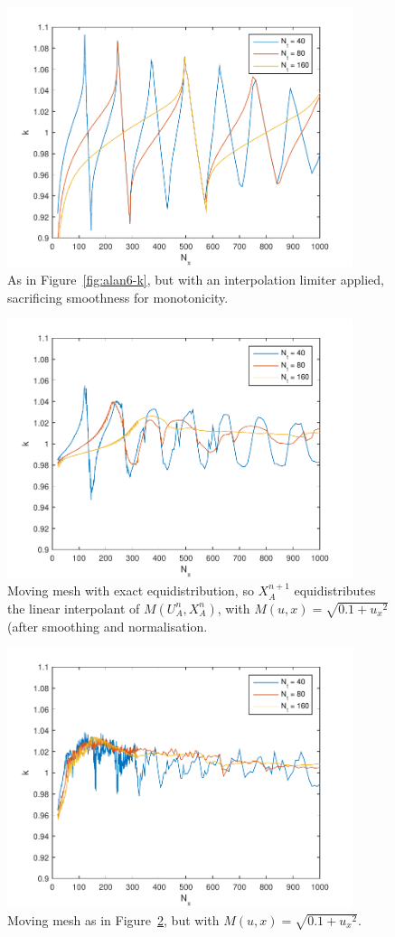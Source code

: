 \documentclass{article}
\begin{document}
\begin{figure}[hbtp]
\centering
  \includegraphics[width=0.9\textwidth]{alan5-k.pdf}
  \caption{As in Figure~\ref{fig:alan6-k}, but with an interpolation limiter
  applied, sacrificing smoothness for monotonicity.
  \label{fig:alan5-k}}
\end{figure}
\begin{figure}[htbp]
\centering
  \includegraphics[width=0.9\textwidth]{alan4-k.pdf}
  \caption{Moving mesh with exact equidistribution, so $X_A^{n+1}$
    equidistributes the linear interpolant of $M(U^n_A,X^n_A)$, with
    $M(u,x) = \sqrt{0.1 + {u_x}^2}$ (after smoothing and normalisation.
  \label{fig:alan4-k}}
\end{figure}
\begin{figure}[hbtp]
\centering
  \includegraphics[width=0.9\textwidth]{alan7-k.pdf}
  \caption{Moving mesh as in Figure~\ref{fig:alan4-k}, but with
  $M(u,x) = \sqrt{0.1 + {u_x}^2}$.
  \label{fig:alan7-k}}
\end{figure}
\end{document}

